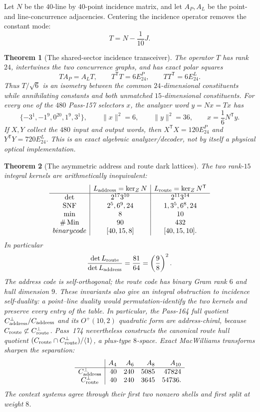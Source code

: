 \documentclass[12pt,a4paper]{article}
\def\mathbb#1{#1}%
\def\mathbf#1{#1}%
\def\text#1{#1}%
\newtheorem{theorem}{Theorem}[section]
\theoremstyle{definition}
\begin{document}
Let $N$ be the $40$-line by $40$-point incidence matrix, and let
$A_P,A_L$ be the point- and line-concurrence adjacencies.  Centering the
incidence operator removes the constant mode:
\[
  T=N-\frac1{10}J.
\]

\begin{theorem}[The shared-sector incidence transceiver]
\label{thm:pass173-transceiver}
The operator $T$ has rank $24$, intertwines the two concurrence graphs,
and has exact polar squares
\[
  TA_P=A_LT,
  \qquad
  T^{\mathsf T}T=6E_{24}^{P},
  \qquad
  TT^{\mathsf T}=6E_{24}^{L}.
\]
Thus $T/\sqrt6$ is an isometry between the common $24$-dimensional
constituents while annihilating constants and both unmatched
$15$-dimensional constituents.  For every one of the $480$ Pass-157
selectors $x$, the analyzer word $y=Nx=Tx$ has
\[
 \{-3^1,-1^9,0^{20},1^9,3^1\},
 \qquad \|x\|^2=6,\qquad \|y\|^2=36,
 \qquad x=\frac16N^{\mathsf T}y.
\]
If $X,Y$ collect the $480$ input and output words, then
$X^{\mathsf T}X=120E_{24}^{P}$ and
$Y^{\mathsf T}Y=720E_{24}^{L}$.  This is an exact algebraic
analyzer/decoder, not by itself a physical optical implementation.
\end{theorem}

\begin{theorem}[The asymmetric address and route dark lattices]
\label{thm:pass173-dark-lattices}
The two rank-$15$ integral kernels are arithmetically inequivalent:
\[
\begin{array}{c|c|c}
 & L_{\rm address}=\ker_{\mathbb Z}N
 & L_{\rm route}=\ker_{\mathbb Z}N^{\mathsf T}\\ \hline
\det &2^{17}3^{10}&2^{11}3^{14}\\
\operatorname{SNF}&2^5,6^9,24&1,3^5,6^8,24\\
\min&8&10\\
\#\operatorname{Min}&90&432\\
\text{binary code}&[40,15,8]&[40,15,10].
\end{array}
\]
In particular
\[
 \frac{\det L_{\rm route}}{\det L_{\rm address}}
 =\frac{81}{64}=\left(\frac98\right)^2.
\]
The address code is self-orthogonal; the route code has binary Gram rank
$6$ and hull dimension $9$.  These invariants also give an integral
obstruction to incidence self-duality: a point--line duality would
permutation-identify the two kernels and preserve every entry of the
table.  In particular, the Pass-164 full quotient
$C_{\rm address}^{\perp}/C_{\rm address}$ and its $O^+(10,2)$ quadratic
form are address-chiral, because
$C_{\rm route}\not\subset C_{\rm route}^{\perp}$.  Pass~174 nevertheless
constructs the canonical route hull quotient
$(C_{\rm route}\cap C_{\rm route}^{\perp})/\langle\mathbf1\rangle$, a
plus-type $8$-space.  Exact MacWilliams transforms sharpen the separation:
\[
\begin{array}{c|rrrr}
 &A_4&A_6&A_8&A_{10}\\ \hline
C_{\rm address}^{\perp}&40&240&5085&47824\\
C_{\rm route}^{\perp}&40&240&3645&54736.
\end{array}
\]
The context systems agree through their first two nonzero shells and
first split at weight $8$.
\end{theorem}
\end{document}
